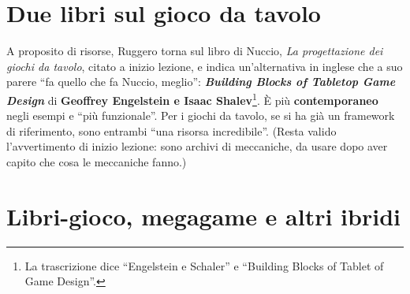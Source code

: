 \section{Due libri sul gioco da tavolo}
\label{a2:sec:tavolo-libri}



A proposito di risorse, Ruggero torna sul libro di Nuccio, \emph{La
progettazione dei giochi da tavolo}, citato a inizio lezione, e indica
un'alternativa in inglese che a suo parere ``fa quello che fa Nuccio, meglio'':
\textbf{\emph{Building Blocks of Tabletop Game Design}} di \textbf{Geoffrey
Engelstein e Isaac Shalev}\footnote{La trascrizione dice ``Engelstein e
Schaler'' e ``Building Blocks of Tablet of Game Design''.}. È più
\textbf{contemporaneo} negli esempi e ``più funzionale''. Per i giochi da tavolo,
se si ha già un framework di riferimento, sono entrambi ``una risorsa
incredibile''. (Resta valido l'avvertimento di inizio lezione: sono archivi di
meccaniche, da usare dopo aver capito che cosa le meccaniche fanno.)

\section{Libri-gioco, megagame e altri ibridi}
\label{a2:sec:tavolo-ibridi}



